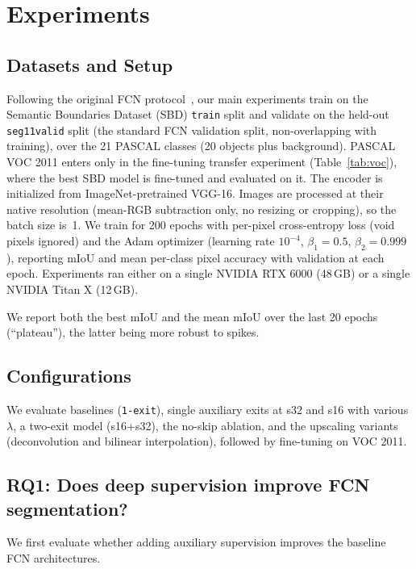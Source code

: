 \documentclass{article}
\begin{document}
\section{Experiments}

    \subsection{Datasets and Setup}

    Following the original FCN protocol~\cite{ref_fcn}, our main experiments train
    on the Semantic Boundaries Dataset (SBD) \texttt{train} split and validate on
    the held-out \texttt{seg11valid} split (the standard FCN validation split,
    non-overlapping with training), over the 21 PASCAL classes (20 objects plus
    background). PASCAL VOC 2011 enters only in the fine-tuning transfer
    experiment (Table~\ref{tab:voc}), where the best SBD model is fine-tuned and
    evaluated on it. The encoder is initialized from ImageNet-pretrained VGG-16. Images
    are processed at their native resolution (mean-RGB subtraction only, no
    resizing or cropping), so the batch size is~1. We train for 200 epochs with
    per-pixel cross-entropy loss (void pixels ignored) and the Adam optimizer
    (learning rate $10^{-4}$, $\beta_1{=}0.5$, $\beta_2{=}0.999$), reporting mIoU
    and mean per-class pixel accuracy with validation at each epoch. Experiments
    ran either on a single NVIDIA RTX 6000 (48\,GB) or a single NVIDIA Titan X
    (12\,GB).

    We report both the best mIoU and the mean mIoU over the last 20 epochs
    (``plateau''), the latter being more robust to spikes.

    \subsection{Configurations}
    We evaluate baselines (\texttt{1-exit}), single auxiliary exits at s32 and s16
    with various $\lambda$, a two-exit model (s16+s32), the no-skip ablation, and
    the upscaling variants (deconvolution and bilinear interpolation), followed by
    fine-tuning on VOC 2011.

    \subsection{RQ1: Does deep supervision improve FCN segmentation?}

    We first evaluate whether adding auxiliary supervision improves the
    baseline FCN architectures.
\end{document}
